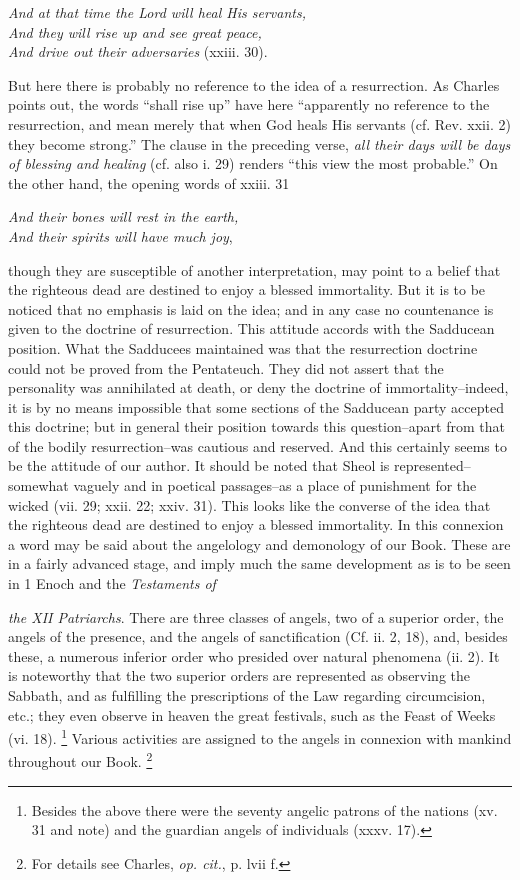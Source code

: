 \emph{And at that time the Lord will heal His servants,\\
And they will rise up and see great peace,\\
And drive out their adversaries} (xxiii. 30).

But here there is probably no reference to the idea of a resurrection. As Charles points out, the words ``shall rise up'' have here ``apparently no reference to the resurrection, and mean merely that when God heals His servants (cf. Rev. xxii. 2) they become strong.'' The clause in the preceding verse, \emph{all their days will be days of blessing and healing} (cf. also i. 29) renders ``this view the most probable.'' On the other hand, the opening words of xxiii. 31

\emph{And their bones will rest in the earth,\\
And their spirits will have much joy},

though they are susceptible of another interpretation, may point to a belief that the righteous dead are destined to enjoy a blessed immortality. But it is to be noticed that no emphasis is laid on the idea; and in any case no countenance is given to the doctrine of resurrection. This attitude accords with the Sadducean position. What the Sadducees maintained was that the resurrection doctrine could not be proved from the Pentateuch. They did not assert that the personality was annihilated at death, or deny the doctrine of immortality--indeed, it is by no means impossible that some sections of the Sadducean party accepted this doctrine; but in general their position towards this question--apart from that of the bodily resurrection--was cautious and reserved. And this certainly seems to be the attitude of our author. It should be noted that Sheol is represented--somewhat vaguely and in poetical passages--as a place of punishment for the wicked (vii. 29; xxii. 22; xxiv. 31). This looks like the converse of the idea that the righteous dead are destined to enjoy a blessed immortality. In this connexion a word may be said about the angelology and demonology of our Book. These are in a fairly advanced stage, and imply much the same development as is to be seen in 1 Enoch and the \emph{Testaments of}

\emph{the XII Patriarchs}. There are three classes of angels, two of a superior order, the angels of the presence, and the angels of sanctification (Cf. ii. 2, 18), and, besides these, a numerous inferior order who presided over natural phenomena (ii. 2). It is noteworthy that the two superior orders are represented as observing the Sabbath, and as fulfilling the prescriptions of the Law regarding circumcision, etc.; they even observe in heaven the great festivals, such as the Feast of Weeks (vi. 18). \footnote{Besides the above there were the seventy angelic patrons of the nations (xv. 31 and note) and the guardian angels of individuals (xxxv. 17).} Various activities are assigned to the angels in connexion with mankind throughout our Book. \footnote{For details see Charles, \emph{op. cit.}, p. lvii f.}


